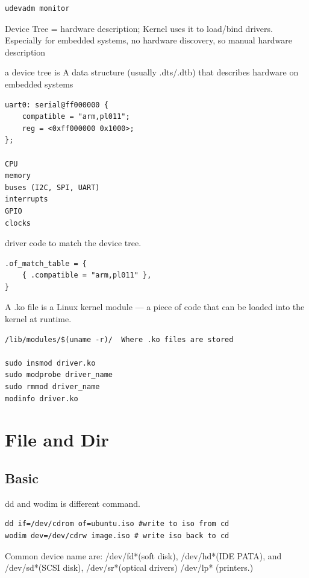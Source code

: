 \documentclass[paper=8.5in:11in, twoside, 12pt, pagesize=pdftex]{book}
\begin{document}
\begin{lstlisting}
udevadm monitor
\end{lstlisting}

	\par Device Tree = hardware description; Kernel uses it to load/bind drivers.  Especially for embedded systems, no hardware discovery, so manual hardware description

	\par a device tree is A data structure (usually .dts/.dtb) that describes hardware on embedded systems
\begin{lstlisting}
uart0: serial@ff000000 {
    compatible = "arm,pl011";
    reg = <0xff000000 0x1000>;
};

CPU
memory
buses (I2C, SPI, UART)
interrupts
GPIO
clocks
\end{lstlisting}

	\par driver code to match the device tree.
\begin{lstlisting}
.of_match_table = {
    { .compatible = "arm,pl011" },
}
\end{lstlisting}

	\par A .ko file is a Linux kernel module — a piece of code that can be loaded into the kernel at runtime.
\begin{lstlisting}
/lib/modules/$(uname -r)/  Where .ko files are stored

sudo insmod driver.ko
sudo modprobe driver_name
sudo rmmod driver_name
modinfo driver.ko
\end{lstlisting}

\section{File and Dir}

\subsection{Basic}

	\par dd and wodim is different command.  
\begin{lstlisting}
dd if=/dev/cdrom of=ubuntu.iso #write to iso from cd
wodim dev=/dev/cdrw image.iso # write iso back to cd
\end{lstlisting} 

	\par Common device name are: /dev/fd*(soft disk), /dev/hd*(IDE PATA), and /dev/sd*(SCSI disk), /dev/sr*(optical drivers) /dev/lp* (printers.)
\end{document}

